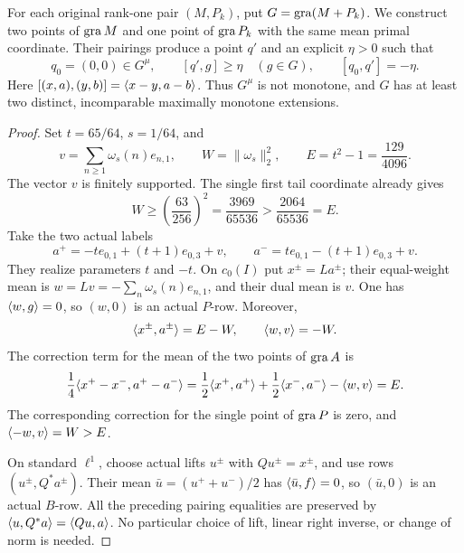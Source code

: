 \begin{corollary}
\label{cor:incompatible}
For each original rank-one pair $(M,P_k)$, put
$G=\operatorname{gra}(M+P_k)$. We construct two points of $\operatorname{gra} M$ and one point
of $\operatorname{gra} P_k$ with the same mean primal coordinate. Their pairings produce
a point $q'$ and an explicit $\eta>0$ such that
\begin{equation}
q_0=(0,0)\in G^\mu,\qquad
[q',g]\ge\eta\quad(g\in G),\qquad
[q_0,q']=-\eta.
\label{eq:cor-incompatible}
\end{equation}
Here $[(x,a),(y,b)]=\langle x-y,a-b\rangle$.
Thus $G^\mu$ is not monotone, and $G$ has at least two distinct,
incomparable maximally monotone extensions.
\end{corollary}
\begin{proof}
Set $t=65/64$, $s=1/64$, and
\[
v=\sum_{n\ge1}\omega_s(n)e_{n,1},\qquad
W=\|\omega_s\|_2^2,\qquad E=t^2-1=\frac{129}{4096}.
\]
The vector $v$ is finitely supported. The single first tail coordinate
already gives
\[
W\ge\left(\frac{63}{256}\right)^2
  =\frac{3969}{65536}>\frac{2064}{65536}=E.
\]
Take the two actual labels
\[
a^+=-t e_{0,1}+(t+1)e_{0,3}+v,
\qquad
a^-=t e_{0,1}-(t+1)e_{0,3}+v.
\]
They realize parameters $t$ and $-t$. On $c_0(I)$ put
$x^\pm=La^\pm$; their equal-weight mean is
$w=Lv=-\sum_n\omega_s(n)e_{n,1}$, and their dual mean is $v$.
One has $\langle w,g\rangle=0$, so $(w,0)$ is an actual $P$-row.
Moreover,
\[
\langle x^\pm,a^\pm\rangle=E-W,\qquad
\langle w,v\rangle=-W.
\]
The correction term for the mean of the two points of $\operatorname{gra} A$ is
\[
\frac14\langle x^+-x^-,a^+-a^-\rangle
=\frac12\langle x^+,a^+\rangle+\frac12\langle x^-,a^-\rangle
  -\langle w,v\rangle=E.
\]
The corresponding correction for the single point of $\operatorname{gra} P$ is zero,
and $\langle -w,v\rangle=W>E$.

On standard $\ell^1$, choose actual lifts $u^\pm$ with
$Qu^\pm=x^\pm$, and use rows $(u^\pm,Q^*a^\pm)$.
Their mean $\bar u=(u^++u^-)/2$ has
$\langle \bar u,f\rangle=0$, so $(\bar u,0)$ is an actual $B$-row.
All the preceding pairing equalities are preserved by
$\langle u,Q^*a\rangle=\langle Qu,a\rangle$. No particular choice of lift,
linear right inverse, or change of norm is needed.


\end{proof}
